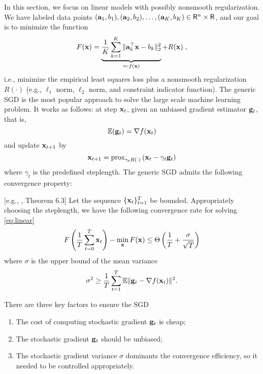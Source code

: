 \vspace{-0.5em}
In this section, we focus on linear models with possibly nonsmooth regularization. We have labeled data points $({\bf a}_1, b_1), ({\bf a}_2, b_2), \ldots, ({\bf a}_K, b_K) \in \mathsf{R}^n \times \mathsf{R}$, and our goal is to minimize the function
\begin{align}
F({\bf x}) = \underbrace{\frac{1}{K} \sum_{k = 1}^K \| {\bf a}_k^\top {\bf x} - b_k \|_2^2}_{=: f({\bf x})} + R({\bf x}) \; ,
\label{eq:linear}
\end{align}
i.e., minimize the empirical least squares loss plus a nonsmooth regularization $R(\cdot)$ (e.g., $\ell_1$ norm, $\ell_2$ norm, and constraint indicator function). The generic SGD is the most popular approach to solve the large scale machine learning problem. It works as follows: at step ${\bf x}_t$, given an unbiased gradient estimator ${\bf g}_t$, that is, 
\[
\mathbb{E}({\bf g}_t) = \nabla f({\bf x}_t)
\]
and update ${\bf x}_{t+1}$ by
\[
{\bf x}_{t+1} = \text{prox}_{\gamma_t R(\cdot)}\left( {\bf x}_t - \gamma_t {\bf g}_t\right)
\]
where $\gamma_t$ is the predefined steplength. The generic SGD admits the following convergence property:
\begin{theorem}\label{thm:sgd-conv}[e.g., \cite{2014arXiv1405.4980B}, Theorem 6.3]
Let the sequence $\{{\bf x}_t\}_{t=1}^T$ be bounded. Appropriately choosing the steplength,%
we have the following convergence rate for solving \eqref{eq:linear}
% 
\begin{equation}
F\left(\frac{1}{T} \sum_{t = 0}^T {\bf x}_t\right) - \min_{{\bf x}}F({\bf x}) \leq \Theta\left({1\over T} + {\sigma \over \sqrt{T}}\right) 
\label{eq:sgd-conv}
\end{equation}
where $\sigma$ is the upper bound of the mean variance 
\[
\sigma^2 \geq {1\over T}\sum_{t=1}^T \mathbb{E}\|{\bf g}_t - \nabla f({\bf x}_t)\|^2. 
\]
\end{theorem} 
There are three key factors to ensure the SGD
\begin{enumerate}
\item The cost of computing stochastic gradient ${\bf g}_t$ is cheap;
\item The stochastic gradient ${\bf g}_t$ should be unbiased;
\item The stochastic gradient variance $\sigma$ dominants the convergence efficiency, so it needed to be controlled appropriately.
\end{enumerate}
